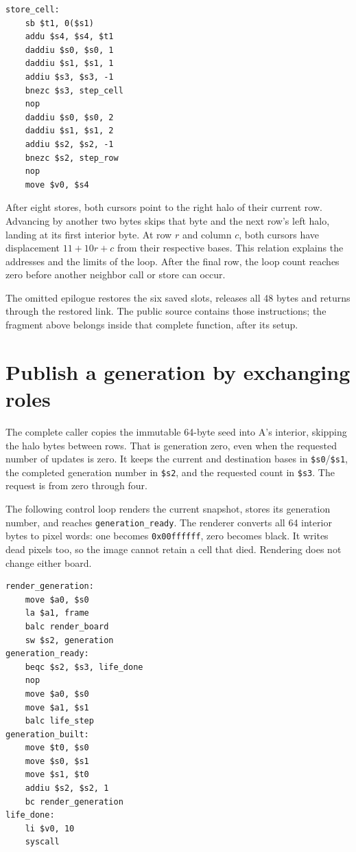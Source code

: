 \noindent\begin{minipage}{\linewidth}
  \begin{verbatim}
store_cell:
    sb $t1, 0($s1)
    addu $s4, $s4, $t1
    daddiu $s0, $s0, 1
    daddiu $s1, $s1, 1
    addiu $s3, $s3, -1
    bnezc $s3, step_cell
    nop
    daddiu $s0, $s0, 2
    daddiu $s1, $s1, 2
    addiu $s2, $s2, -1
    bnezc $s2, step_row
    nop
    move $v0, $s4
\end{verbatim}
\end{minipage}

After eight stores, both cursors point to the right halo of their current row.
Advancing by another two bytes skips that byte and the next row's left halo,
landing at its first interior byte. At row $r$ and column $c$, both cursors have
displacement $11+10r+c$ from their respective bases. This relation explains the
addresses and the limits of the loop. After the final row, the loop count reaches
zero before another neighbor call or store can occur.

The omitted epilogue restores the six saved slots, releases all 48 bytes and
returns through the restored link. The public source contains those instructions;
the fragment above belongs inside that complete function, after its setup.

\section{Publish a generation by exchanging roles}

The complete caller copies the immutable 64-byte seed into A's interior, skipping
the halo bytes between rows. That is generation zero, even when the requested
number of updates is zero. It keeps the current and destination bases in
\texttt{\$s0}/\texttt{\$s1}, the completed generation number in \texttt{\$s2}, and
the requested count in \texttt{\$s3}. The request is from zero through four.

The following control loop renders the current snapshot, stores its generation
number, and reaches \texttt{generation\_ready}. The renderer converts all 64
interior bytes to pixel words: one becomes \texttt{0x00ffffff}, zero becomes black.
It writes dead pixels too, so the image cannot retain a cell that died. Rendering
does not change either board.

\noindent\begin{minipage}{\linewidth}
  \begin{verbatim}
render_generation:
    move $a0, $s0
    la $a1, frame
    balc render_board
    sw $s2, generation
generation_ready:
    beqc $s2, $s3, life_done
    nop
    move $a0, $s0
    move $a1, $s1
    balc life_step
generation_built:
    move $t0, $s0
    move $s0, $s1
    move $s1, $t0
    addiu $s2, $s2, 1
    bc render_generation
life_done:
    li $v0, 10
    syscall
\end{verbatim}
\end{minipage}


